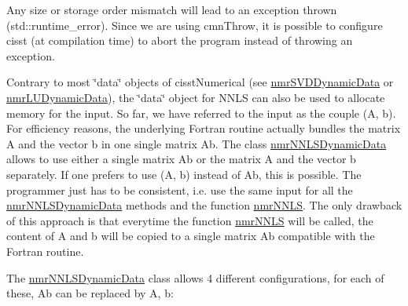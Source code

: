 Any size or storage order mismatch will lead to an exception thrown (std\+::runtime\+\_\+error). Since we are using cmn\+Throw, it is possible to configure cisst (at compilation time) to abort the program instead of throwing an exception.

Contrary to most \char`\"{}data\char`\"{} objects of cisst\+Numerical (see \hyperlink{classnmr_s_v_d_dynamic_data}{nmr\+S\+V\+D\+Dynamic\+Data} or \hyperlink{classnmr_l_u_dynamic_data}{nmr\+L\+U\+Dynamic\+Data}), the \char`\"{}data\char`\"{} object for N\+N\+L\+S can also be used to allocate memory for the input. So far, we have referred to the input as the couple (A, b). For efficiency reasons, the underlying Fortran routine actually bundles the matrix A and the vector b in one single matrix Ab. The class \hyperlink{classnmr_n_n_l_s_dynamic_data}{nmr\+N\+N\+L\+S\+Dynamic\+Data} allows to use either a single matrix Ab or the matrix A and the vector b separately. If one prefers to use (A, b) instead of Ab, this is possible. The programmer just has to be consistent, i.\+e. use the same input for all the \hyperlink{classnmr_n_n_l_s_dynamic_data}{nmr\+N\+N\+L\+S\+Dynamic\+Data} methods and the function \hyperlink{nmr_n_n_l_s_8h_afd1108e6bc3e5d308f34bc7b31fd3278}{nmr\+N\+N\+L\+S}. The only drawback of this approach is that everytime the function \hyperlink{nmr_n_n_l_s_8h_afd1108e6bc3e5d308f34bc7b31fd3278}{nmr\+N\+N\+L\+S} will be called, the content of A and b will be copied to a single matrix Ab compatible with the Fortran routine.

The \hyperlink{classnmr_n_n_l_s_dynamic_data}{nmr\+N\+N\+L\+S\+Dynamic\+Data} class allows 4 different configurations, for each of these, Ab can be replaced by A, b\+:



